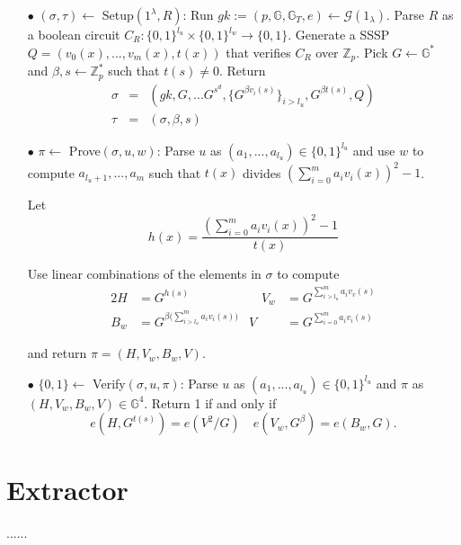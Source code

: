 \documentclass[lnbip]{svmultln}
\begin{document}
\begin{itemize}
\item[$\bullet$] $(\sigma,\tau) \leftarrow$ Setup$(1^\lambda,R)$: Run $gk := (p,\mathbb{G},\mathbb{G}_T,e) \leftarrow \mathcal{G}(1_\lambda)$. Parse $R$ as a boolean circuit $C_R:\{0,1\}^{l_u}\times \{0,1\}^{l_w} \rightarrow \{0,1\}$. Generate a SSSP $Q = (v_0(x),...,v_m(x),t(x))$ that verifies $C_R$ over $\mathbb{Z}_p$. Pick $G \leftarrow \mathbb{G}^*$ and $\beta,s \leftarrow \mathbb{Z}_p^*$ such that $t(s) \neq 0$. Return
\begin{eqnarray*}
  \sigma &=& (gk,G,...G^{s^d},\{G^{\beta v_i(s)}\}_{i>l_u},G^{\beta t(s)},Q)\\
  \tau &=& (\sigma,\beta,s)
\end{eqnarray*}

\item[$\bullet$] $\pi \leftarrow$ Prove$(\sigma, u,w)$: Parse $u$ as $(a_1,...,a_{l_u}) \in \{0,1\}^{l_u}$ and use $w$ to compute $a_{l_u+1},...,a_m$ such that $t(x)$ divides $\left(\sum\limits_{i=0}^ma_i v_i(x)\right)^2-1$.

Let 
$$h(x) = \frac{\left(\sum\limits_{i=0}^ma_i v_i(x)\right)^2-1}{t(x)}$$

Use linear combinations of the elements in $\sigma$ to compute
\begin{alignat*}{2}
 H &= G^{h(s)}  &\quad V_w &= G^{\sum\limits_{i>l_u}^m a_iv_v(s)} \\  
 B_w &= G^{\beta\big(\sum\limits_{i>l_u}^m a_iv_i(s)\big)} & 
 V &= G^{\sum\limits_{i=0}^m a_iv_i(s)}
\end{alignat*}

and return $\pi=(H,V_w,B_w,V)$.\\

\item[$\bullet$] $\{0,1\} \leftarrow$ Verify$(\sigma,u,\pi)$: Parse $u$ as $(a_1,...,a_{l_u})\in \{0,1\}^{l_u}$ and $\pi$ as $(H,V_w,B_w,V) \in \mathbb{G}^4$. Return 1 if and only if
$$e(H,G ^{t(s)})=e(V^2/G) \quad e(V_w,G^\beta)=e(B_w,G).  $$
\end{itemize}

\section{Extractor}
......

\end{document}
